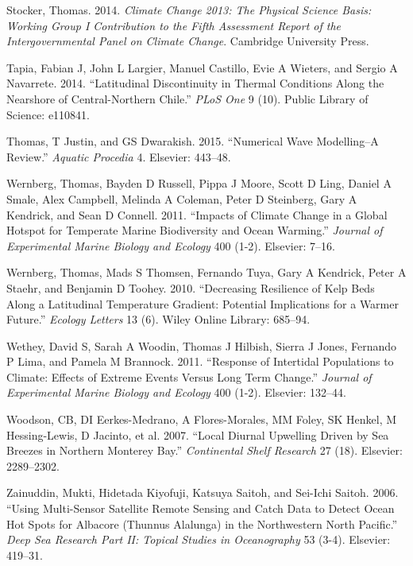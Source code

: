 \documentclass[12pt,A4paper,]{article}
\begin{document}
\hypertarget{ref-Stocker2014}{}
Stocker, Thomas. 2014. \emph{Climate Change 2013: The Physical Science
Basis: Working Group I Contribution to the Fifth Assessment Report of
the Intergovernmental Panel on Climate Change}. Cambridge University
Press.

\hypertarget{ref-Tapia2014}{}
Tapia, Fabian J, John L Largier, Manuel Castillo, Evie A Wieters, and
Sergio A Navarrete. 2014. ``Latitudinal Discontinuity in Thermal
Conditions Along the Nearshore of Central-Northern Chile.'' \emph{PLoS
One} 9 (10). Public Library of Science: e110841.

\hypertarget{ref-Thomas2015}{}
Thomas, T Justin, and GS Dwarakish. 2015. ``Numerical Wave Modelling--A
Review.'' \emph{Aquatic Procedia} 4. Elsevier: 443--48.

\hypertarget{ref-Wernberg2011}{}
Wernberg, Thomas, Bayden D Russell, Pippa J Moore, Scott D Ling, Daniel
A Smale, Alex Campbell, Melinda A Coleman, Peter D Steinberg, Gary A
Kendrick, and Sean D Connell. 2011. ``Impacts of Climate Change in a
Global Hotspot for Temperate Marine Biodiversity and Ocean Warming.''
\emph{Journal of Experimental Marine Biology and Ecology} 400 (1-2).
Elsevier: 7--16.

\hypertarget{ref-Wernberg2010}{}
Wernberg, Thomas, Mads S Thomsen, Fernando Tuya, Gary A Kendrick, Peter
A Staehr, and Benjamin D Toohey. 2010. ``Decreasing Resilience of Kelp
Beds Along a Latitudinal Temperature Gradient: Potential Implications
for a Warmer Future.'' \emph{Ecology Letters} 13 (6). Wiley Online
Library: 685--94.

\hypertarget{ref-Wethey2011}{}
Wethey, David S, Sarah A Woodin, Thomas J Hilbish, Sierra J Jones,
Fernando P Lima, and Pamela M Brannock. 2011. ``Response of Intertidal
Populations to Climate: Effects of Extreme Events Versus Long Term
Change.'' \emph{Journal of Experimental Marine Biology and Ecology} 400
(1-2). Elsevier: 132--44.

\hypertarget{ref-Woodson2007}{}
Woodson, CB, DI Eerkes-Medrano, A Flores-Morales, MM Foley, SK Henkel, M
Hessing-Lewis, D Jacinto, et al. 2007. ``Local Diurnal Upwelling Driven
by Sea Breezes in Northern Monterey Bay.'' \emph{Continental Shelf
Research} 27 (18). Elsevier: 2289--2302.

\hypertarget{ref-Zainuddin2006}{}
Zainuddin, Mukti, Hidetada Kiyofuji, Katsuya Saitoh, and Sei-Ichi
Saitoh. 2006. ``Using Multi-Sensor Satellite Remote Sensing and Catch
Data to Detect Ocean Hot Spots for Albacore (Thunnus Alalunga) in the
Northwestern North Pacific.'' \emph{Deep Sea Research Part II: Topical
Studies in Oceanography} 53 (3-4). Elsevier: 419--31.
\end{document}
